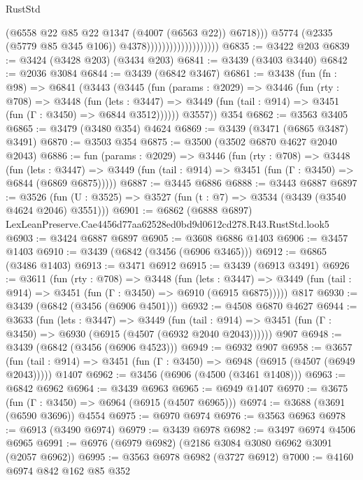 \begin{lexlean}{RustStd}
\begin{coremodule}
                                              (@6558 @22 @85 @22 @1347 (@4007 (@6563 @22)) @6718)))
                                          @5774
                                          (@2335 (@5779 @85 @345 @106))
                                          @4378)))))))))))))))))))
@6835 := @3422 @203
@6839 := @3424 (@3428 @203) (@3434 @203)
@6841 := @3439 (@3403 @3440)
@6842 := @2036 @3084
@6844 := @3439 (@6842 @3467)
@6861 := @3438
    (fun (fn : @98) =>
    @6841
      (@3443
        (@3445
          (fun (params : @2029) =>
          @3446
            (fun (rty : @708) =>
            @3448
              (fun (lets : @3447) =>
              @3449 (fun (tail : @914) => @3451 (fun (Γ : @3450) => @6844 @3512))))))
        @3557))
    @354
@6862 := @3563 @3405
@6865 := @3479 (@3480 @354) @4624
@6869 := @3439 (@3471 (@6865 @3487) @3491)
@6870 := @3503 @354
@6875 := @3500 (@3502 @6870 @4627 @2040 @2043)
@6886 := fun (params : @2029) =>
  @3446
    (fun (rty : @708) =>
    @3448
      (fun (lets : @3447) =>
      @3449 (fun (tail : @914) => @3451 (fun (Γ : @3450) => @6844 (@6869 @6875)))))
@6887 := @3445 @6886
@6888 := @3443 @6887
@6897 := @3526 (fun (U : @3525) => @3527 (fun (t : @7) => @3534 (@3439 (@3540 @4624 @2046) @3551)))
@6901 := @6862 (@6888 @6897) LexLeanPreserve.Cae4456d77aa62528ed0bd9d0612cd278.R43.RustStd.look5
@6903 := @3424 @6887 @6897
@6905 := @3608 @6886 @1403
@6906 := @3457 @1403
@6910 := @3439 (@6842 (@3456 (@6906 @3465)))
@6912 := @6865 (@3486 @1403)
@6913 := @3471 @6912
@6915 := @3439 (@6913 @3491)
@6926 := @3611
    (fun (rty : @708) =>
    @3448
      (fun (lets : @3447) =>
      @3449 (fun (tail : @914) => @3451 (fun (Γ : @3450) => @6910 (@6915 @6875)))))
    @817
@6930 := @3439 (@6842 (@3456 (@6906 @4501)))
@6932 := @4508 @6870 @4627
@6944 := @3633
    (fun (lets : @3447) =>
    @3449
      (fun (tail : @914) => @3451 (fun (Γ : @3450) => @6930 (@6915 (@4507 (@6932 @2040 @2043))))))
    @907
@6948 := @3439 (@6842 (@3456 (@6906 @4523)))
@6949 := @6932 @907
@6958 := @3657
    (fun (tail : @914) => @3451 (fun (Γ : @3450) => @6948 (@6915 (@4507 (@6949 @2043)))))
    @1407
@6962 := @3456 (@6906 (@4500 (@3461 @1408)))
@6963 := @6842 @6962
@6964 := @3439 @6963
@6965 := @6949 @1407
@6970 := @3675 (fun (Γ : @3450) => @6964 (@6915 (@4507 @6965)))
@6974 := @3688 (@3691 (@6590 @3696)) @4554
@6975 := @6970 @6974
@6976 := @3563 @6963
@6978 := @6913 (@3490 @6974)
@6979 := @3439 @6978
@6982 := @3497 @6974 @4506 @6965
@6991 := @6976 (@6979 @6982) (@2186 @3084 @3080 @6962 @3091 (@2057 @6962))
@6995 := @3563 @6978 @6982 (@3727 @6912)
@7000 := @4160 @6974 @842 @162 @85 @352

\end{coremodule}
\end{lexlean}
